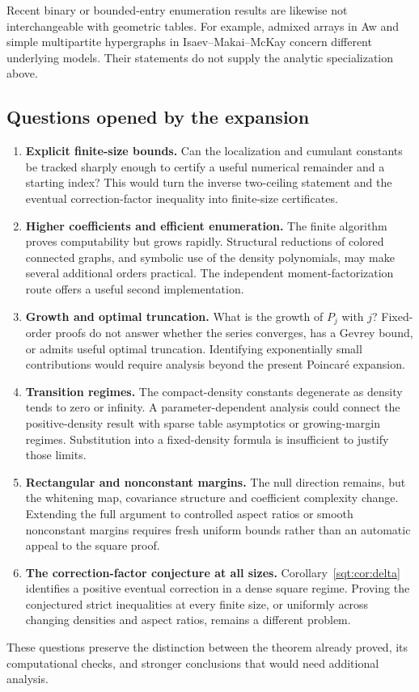 Recent binary or bounded-entry enumeration results are likewise not interchangeable with geometric tables. For example, admixed arrays in Aw \cite{Aw} and simple multipartite hypergraphs in Isaev--Makai--McKay \cite{IMM} concern different underlying models. Their statements do not supply the analytic specialization above.

\subsection{Questions opened by the expansion}
\begin{enumerate}
\item \textbf{Explicit finite-size bounds.} Can the localization and cumulant constants be tracked sharply enough to certify a useful numerical remainder and a starting index? This would turn the inverse two-ceiling statement and the eventual correction-factor inequality into finite-size certificates.
\item \textbf{Higher coefficients and efficient enumeration.} The finite algorithm proves computability but grows rapidly. Structural reductions of colored connected graphs, and symbolic use of the density polynomials, may make several additional orders practical. The independent moment-factorization route offers a useful second implementation.
\item \textbf{Growth and optimal truncation.} What is the growth of $P_j$ with $j$? Fixed-order proofs do not answer whether the series converges, has a Gevrey bound, or admits useful optimal truncation. Identifying exponentially small contributions would require analysis beyond the present Poincar\'e expansion.
\item \textbf{Transition regimes.} The compact-density constants degenerate as density tends to zero or infinity. A parameter-dependent analysis could connect the positive-density result with sparse table asymptotics or growing-margin regimes. Substitution into a fixed-density formula is insufficient to justify those limits.
\item \textbf{Rectangular and nonconstant margins.} The null direction remains, but the whitening map, covariance structure and coefficient complexity change. Extending the full argument to controlled aspect ratios or smooth nonconstant margins requires fresh uniform bounds rather than an automatic appeal to the square proof.
\item \textbf{The correction-factor conjecture at all sizes.} Corollary~\ref{sqt:cor:delta} identifies a positive eventual correction in a dense square regime. Proving the conjectured strict inequalities at every finite size, or uniformly across changing densities and aspect ratios, remains a different problem.
\end{enumerate}
These questions preserve the distinction between the theorem already proved, its computational checks, and stronger conclusions that would need additional analysis.

